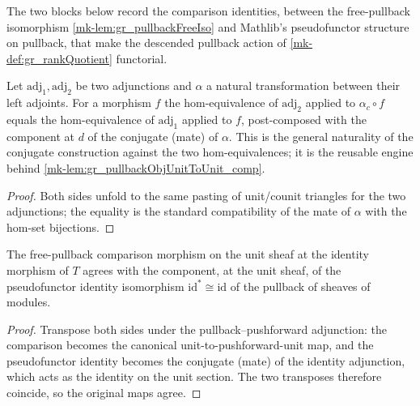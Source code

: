 The two blocks below record the comparison identities, between the free-pullback isomorphism
\ref{mk-lem:gr_pullbackFreeIso} and Mathlib's pseudofunctor structure on pullback, that make
the descended pullback action of \ref{mk-def:gr_rankQuotient} functorial.


\begin{lemma}\label{mk-lem:gr_homEquiv_conjugateEquiv_app}
  \leanok

  Let \(\mathrm{adj}_1, \mathrm{adj}_2\) be two adjunctions and \(\alpha\) a natural
  transformation between their left adjoints. For a morphism \(f\) the hom-equivalence of
  \(\mathrm{adj}_2\) applied to \(\alpha_c \circ f\) equals the hom-equivalence of
  \(\mathrm{adj}_1\) applied to \(f\), post-composed with the component at \(d\) of the
  conjugate (mate) of \(\alpha\). This is the general naturality of the conjugate
  construction against the two hom-equivalences; it is the reusable engine behind
  \ref{mk-lem:gr_pullbackObjUnitToUnit_comp}.
\end{lemma}

\begin{proof}
  \leanok


Both sides unfold to the same pasting of unit/counit triangles for the two adjunctions;
  the equality is the standard compatibility of the mate of \(\alpha\) with the
  hom-set bijections.
\end{proof}

\begin{lemma}\label{mk-lem:gr_pullbackObjUnitToUnit_id}
  \leanok

  The free-pullback comparison morphism on the unit sheaf at the identity morphism of \(T\)
  agrees with the component, at the unit sheaf, of the pseudofunctor identity isomorphism
  \(\mathrm{id}^{*} \cong \mathrm{id}\) of the pullback of sheaves of modules.
\end{lemma}
\begin{proof}
  \leanok

Transpose both sides under the pullback--pushforward adjunction: the comparison becomes the
  canonical unit-to-pushforward-unit map, and the pseudofunctor identity becomes the conjugate
  (mate) of the identity adjunction, which acts as the identity on the unit section. The two
  transposes therefore coincide, so the original maps agree.
\end{proof}

